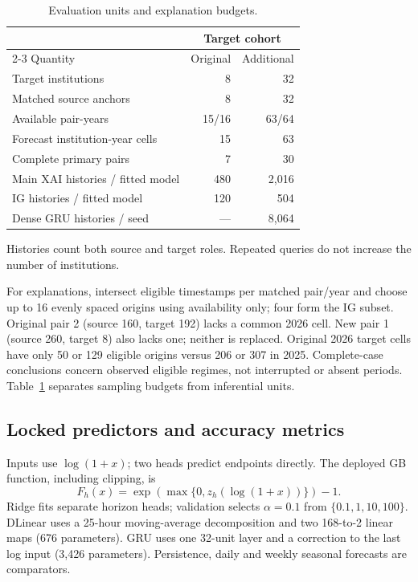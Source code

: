 \documentclass[conference]{IEEEtran}
\begin{document}
\begin{table}[t]\centering
\caption{Evaluation units and explanation budgets.}\label{tab:units}
\small
\renewcommand{\arraystretch}{1.12}
\begin{tabular*}{\columnwidth}{@{\extracolsep{\fill}}lrr@{}}\toprule
&\multicolumn{2}{c}{Target cohort}\\
\cmidrule(l){2-3}
Quantity&Original&Additional\\\midrule
Target institutions&8&32\\
Matched source anchors&8&32\\
Available pair-years&15/16&63/64\\
Forecast institution-year cells&15&63\\
Complete primary pairs&7&30\\
\addlinespace[4pt]
Main XAI histories / fitted model&480&2,016\\
IG histories / fitted model&120&504\\
Dense GRU histories / seed&---&8,064\\\bottomrule
\end{tabular*}
\par\smallskip\raggedright\footnotesize
Histories count both source and target roles. Repeated queries do not increase the number of institutions.
\end{table}

For explanations, intersect eligible timestamps per matched pair/year and choose up to 16 evenly spaced origins using availability only; four form the IG subset. Original pair 2 (source 160, target 192) lacks a common 2026 cell. New pair 1 (source 260, target 8) also lacks one; neither is replaced. Original 2026 target cells have only 50 or 129 eligible origins versus 206 or 307 in 2025. Complete-case conclusions concern observed eligible regimes, not interrupted or absent periods. Table~\ref{tab:units} separates sampling budgets from inferential units.

\subsection{Locked predictors and accuracy metrics}
Inputs use $\log(1+x)$; two heads predict endpoints directly. The deployed GB function, including clipping, is
\begin{equation}
F_h(x)=\exp\!\left(\max\{0,z_h(\log(1+x))\}\right)-1.
\end{equation}
Ridge fits separate horizon heads; validation selects $\alpha=0.1$ from $\{0.1,1,10,100\}$. DLinear uses a 25-hour moving-average decomposition and two 168-to-2 linear maps (676 parameters). GRU uses one 32-unit layer and a correction to the last log input (3,426 parameters). Persistence, daily and weekly seasonal forecasts are comparators.
\end{document}
